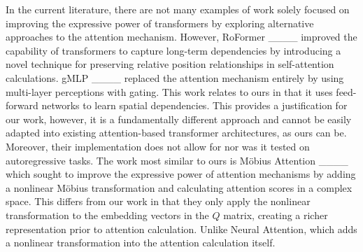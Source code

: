 In the current literature, there are not many examples of work solely focused on improving the expressive power of transformers by exploring alternative approaches to the attention mechanism. However, RoFormer ____ improved the capability of transformers to capture long-term dependencies by introducing a novel technique for preserving relative position relationships in self-attention calculations. gMLP ____ replaced the attention mechanism entirely by using multi-layer perceptions with gating. This work relates to ours in that it uses feed-forward networks to learn spatial dependencies. This provides a justification for our work, however, it is a fundamentally different approach and cannot be easily adapted into existing attention-based transformer architectures, as ours can be. Moreover, their implementation does not allow for nor was it tested on autoregressive tasks. The work most similar to ours is M{\"o}bius Attention ____ which sought to improve the expressive power of attention mechanisms by adding a nonlinear M{\"o}bius transformation and calculating attention scores in a complex space. This differs from our work in that they only apply the nonlinear transformation to the embedding vectors in the $\mathit{Q}$ matrix, creating a richer representation prior to attention calculation. Unlike Neural Attention, which adds a nonlinear transformation into the attention calculation itself. 


